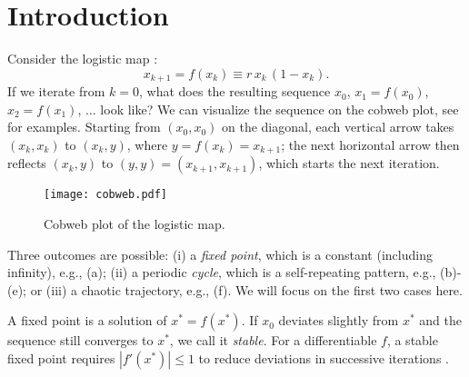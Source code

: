 \documentclass[preprint]{revtex4-1}
\begin{document}
%
%
\section{Introduction}
%
%

Consider the logistic map \cite{may, strogatz}:
%
\begin{equation}
  x_{k+1} = f(x_k) \equiv r \, x_k \, ( 1 - x_k ).
\label{eq:logmap}
\end{equation}
%
If we iterate  from $k = 0$,
what does the resulting sequence $x_0$,
  $x_1 = f(x_0)$,
  $x_2 = f(x_1)$, $\ldots$ look like?
%
%
%
We can visualize the sequence on the cobweb plot,
  see  for examples.
%
Starting from $(x_0, x_0)$ on the diagonal,
  each vertical arrow takes $(x_k, x_k)$ to $(x_k, y)$,
  where $y = f(x_k) = x_{k+1}$;
the next horizontal arrow then reflects $(x_k, y)$ to
  $(y, y) = (x_{k+1}, x_{k+1})$,
  which starts the next iteration.

\begin{figure}[h]
  \begin{minipage}{\linewidth}
    \begin{center}
        \texttt{[image: cobweb.pdf]}
    \end{center}
  \end{minipage}%
  \caption{\label{fig:cobweb}
  Cobweb plot of the logistic map.}
\end{figure}


Three outcomes are possible:
  (i) a \emph{fixed point},
      which is a constant (including infinity),
      e.g., (a);
  (ii) a periodic \emph{cycle},
      which is a self-repeating pattern,
      e.g., (b)-(e);
or
  (iii) a chaotic trajectory,
      e.g., (f).
We will focus on the first two cases here.


A fixed point is a solution of $x^* = f(x^*)$.
%
If $x_0$ deviates slightly from $x^*$
  and the sequence still converges to $x^*$,
  we call it \emph{stable}.
%
For a differentiable $f$,
  a stable fixed point requires $|f'(x^*)| \le 1$
  to reduce deviations in successive iterations \cite{strogatz}.
\end{document}
